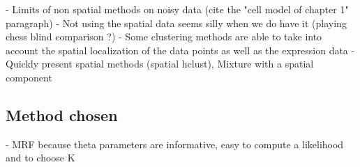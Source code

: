 	
    - Limits of non spatial methods on noisy data (cite the "cell model of chapter 1" paragraph)
    - Not using the spatial data seems silly when we do have it (playing chess blind comparison ?)
    - Some clustering methods are able to take into account the spatial localization of the data points as well as the expression data
    - Quickly present spatial methods (spatial hclust), Mixture with a spatial component

	\subsection{Method chosen}
    - MRF because theta parameters are informative, easy to compute a likelihood and to choose K




